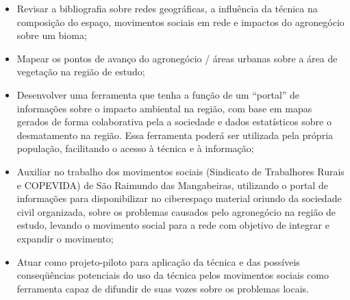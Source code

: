 \begin{itemize}
 \item Revisar a bibliografia sobre redes geográficas, a influência da técnica na composição do espaço, movimentos sociais em rede e impactos do agronegócio sobre um bioma;

 \item Mapear os pontos de avanço do agronegócio / áreas urbanas sobre a área de vegetação na região de estudo;

 \item Desenvolver uma ferramenta que tenha a função de um “portal” de informações sobre o impacto ambiental na região, com base em mapas gerados de forma colaborativa pela a sociedade e dados estatísticos sobre o desmatamento na região. Essa ferramenta poderá ser utilizada pela própria população, facilitando o acesso à técnica e à informação;

 \item Auxiliar no trabalho dos movimentos sociais (Sindicato de Trabalhores Rurais e COPEVIDA) de São Raimundo das Mangabeiras, utilizando o portal de informações para disponibilizar no ciberespaço material oriundo da sociedade civil organizada, sobre os problemas causados pelo agronegócio na região de estudo, levando o movimento social para a rede com objetivo de integrar e expandir o movimento;

 \item Atuar como projeto-piloto  para  aplicação da técnica e das possíveis conseqüências potenciais do uso da técnica pelos movimentos sociais como ferramenta capaz de difundir de suas vozes sobre os problemas locais.
\end{itemize}




